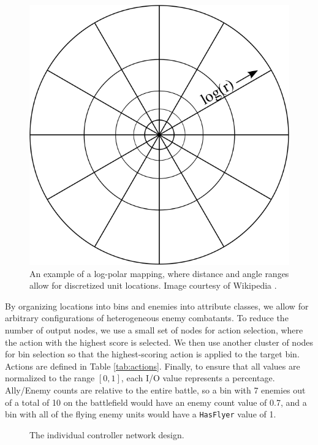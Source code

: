 \documentclass[10pt,a4paper,twocolumn]{article}
\begin{document}
\begin{figure}
\centering
\includegraphics[scale=.3]{figures/logpolar.png}
\caption{An example of a log-polar mapping, where distance and angle ranges allow for discretized unit locations. Image courtesy of Wikipedia \cite{logpolar}.}
\label{fig:logpolar}
\end{figure}

By organizing locations into bins and enemies into attribute classes, we allow for arbitrary configurations of heterogeneous enemy combatants. To reduce the number of output nodes, we use a small set of nodes for action selection, where the action with the highest score is selected. We then use another cluster of nodes for bin selection so that the highest-scoring action is applied to the target bin. Actions are defined in Table \ref{tab:actions}. Finally, to ensure that all values are normalized to the range $[0,1]$, each I/O value represents a percentage. Ally/Enemy counts are relative to the entire battle, so a bin with 7 enemies out of a total of 10 on the battlefield would have an enemy count value of 0.7, and a bin with all of the flying enemy units would have a \texttt{HasFlyer} value of 1.

\begin{figure}

\caption{The individual controller network design.}
\label{fig:design_individual}
\end{figure}
\end{document}
